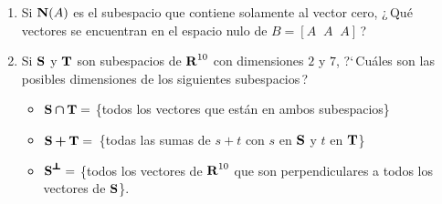 \documentclass[12pt,a4paper]{article}
\newcommand{\bi}[1]{\hbox{\boldmath$#1$}}
\newcommand\1{\mbox{\,\vrule height-0.8pt depth1.0pt width2pc\,}}
\newcommand\2{\mbox{\,\vrule height-0.8pt depth1.0pt width1pc\,}}
\begin{document}
\begin{enumerate}
\item Si $\hbox{\textbf{N}}(A)$ es el subespacio que contiene solamente al vector cero, ¿\,Qué vectores se encuentran en el espacio nulo de $B=[A\;\;A\;\;A]$\,?


\item Si $\hbox{\textbf{S}}$ y $\hbox{\textbf{T}}$ son subespacios de $\hbox{\textbf{R}}^{10}$ con dimensiones $2$ y $7$, ?`\,Cuáles son las posibles dimensiones de los siguientes subespacios\,? %

\vspace{-3pt}
\begin{itemize}
	\item [(i)] $\hbox{\textbf{S}}\bi{\,\cap\,} \hbox{\textbf{T}}=$ \{todos los vectores que están en ambos subespacios\}
\item [(ii)] $\hbox{\textbf{S}}\bi{\,+\,}\hbox{\textbf{T}}=$\, \{todas las sumas de $s+t$ con $s$ en $\hbox{\textbf{S}}$ y $t$ en $\hbox{\textbf{T}}$\}
\item [(iii)] $\bi{\hbox{\textbf{S}}^{\pmb{\bot}}}=$ \{todos los vectores de $\hbox{\textbf{R}}^{10}$ que son perpendiculares a todos los vectores de $\hbox{\textbf{S}}$\}.
\end{itemize}


\end{enumerate}
\end{document}
